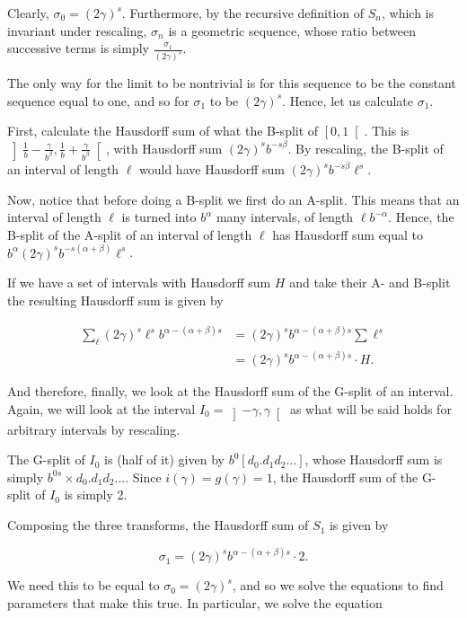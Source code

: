 \documentclass[11pt, reqno]{amsart}
\begin{document}
Clearly, $\sigma_0 = (2 \gamma)^s$. Furthermore, by the recursive definition of $S_n$, which is invariant under rescaling, $\sigma_n$ is a geometric sequence, whose ratio between successive terms is simply $\frac{\sigma_1}{(2 \gamma)^s}$.

The only way for the limit to be nontrivial is for this sequence to be the constant sequence equal to one, and so for $\sigma_1$ to be $(2 \gamma)^s$. Hence, let us calculate $\sigma_1$.

First, calculate the Hausdorff sum of what the B-split of $\left[0, 1 \right[$. This is $\left] \frac 1 b - \frac \gamma{b^\beta}, \frac 1 b + \frac \gamma{b^\beta} \right[$, with Hausdorff sum $(2 \gamma)^s b^{-s \beta}$. By rescaling, the B-split of an interval of length $\ell$ would have Hausdorff sum $(2 \gamma)^s b^{-s \beta} \ell^s$.

Now, notice that before doing a B-split we first do an A-split. This means that an interval of length $\ell$ is turned into $b^\alpha$ many intervals, of length $\ell b^{-\alpha}$. Hence, the B-split of the A-split of an interval of length $\ell$ has Hausdorff sum equal to $b^\alpha (2 \gamma)^s b^{-s (\alpha + \beta)} \ell^s$.

If we have a set of intervals with Hausdorff sum $H$ and take their A- and B-split the resulting Hausdorff sum is given by

\begin{align*}
\sum_\ell (2 \gamma)^s \ell^s b^{\alpha - (\alpha + \beta) s} &=
(2 \gamma)^s b^{\alpha - (\alpha + \beta) s} \sum \ell^s\\
&= (2 \gamma)^s b^{\alpha - (\alpha + \beta) s} \cdot H.
\end{align*}

And therefore, finally, we look at the Hausdorff sum of the G-split of an interval. Again, we will look at the interval $I_0 = \left] -\gamma, \gamma \right[$ as what will be said holds for arbitrary intervals by rescaling.

The G-split of $I_0$ is (half of it) given by $b^0 [ d_0 . d_1 d_2 \dots]$, whose Hausdorff sum is simply $b^{0s} \times d_0 . d_1 d_2 \dots$. Since $i(\gamma) = g(\gamma) = 1$, the Hausdorff sum of the G-split of $I_0$ is simply 2.

Composing the three transforms, the Hausdorff sum of $S_1$ is given by

\[\sigma_1 = (2 \gamma)^s b^{\alpha - (\alpha + \beta) s} \cdot 2.\]

We need this to be equal to $\sigma_0 = (2 \gamma)^s$, and so we solve the equations to find parameters that make this true. In particular, we solve the equation
\end{document}
